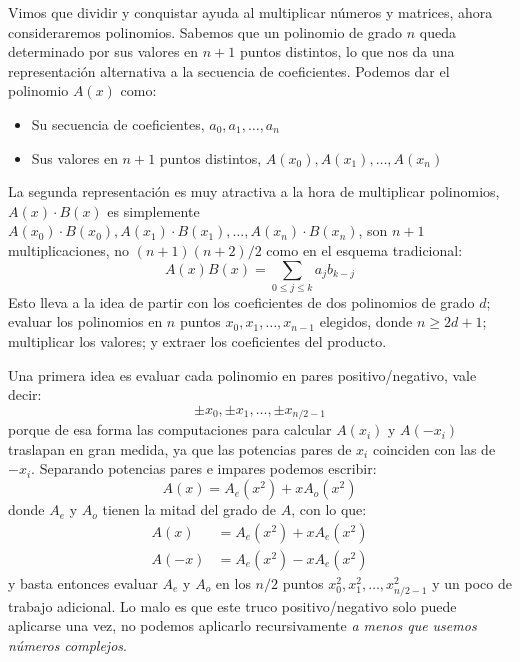   Vimos que dividir y conquistar ayuda al multiplicar números y matrices,
  ahora consideraremos polinomios.
  Sabemos que un polinomio de grado \(n\)
  queda determinado por sus valores en \(n + 1\) puntos distintos,
  lo que nos da una representación alternativa a la secuencia de coeficientes.
  Podemos dar el polinomio \(A(x)\) como:
  \begin{itemize}
  \item
    Su secuencia de coeficientes,
    \(a_0, a_1, \dotsc, a_n\)
  \item
    Sus valores en \(n + 1\) puntos distintos,
    \(A(x_0), A(x_1), \dotsc, A(x_n)\)
  \end{itemize}
  La segunda representación es muy atractiva
  a la hora de multiplicar polinomios,
  \(A(x) \cdot B(x)\) es simplemente
  \(A(x_0) \cdot B(x_0), A(x_1) \cdot B(x_1), \dotsc, A(x_n) \cdot B(x_n)\),
  son \(n + 1\) multiplicaciones,
  no \((n + 1) (n + 2) / 2\) como en el esquema tradicional:
  \begin{equation*}
    [x^k] A(x) B(x)
      = \sum_{0 \le j \le k} a_j b_{k - j}
  \end{equation*}
  Esto lleva a la idea de partir con los coeficientes
  de dos polinomios de grado \(d\);
  evaluar los polinomios en \(n\)
  puntos \(x_0, x_1, \dotsc, x_{n - 1}\) elegidos,
  donde \(n \ge 2 d + 1\);
  multiplicar los valores;
  y extraer los coeficientes del producto.

  Una primera idea es evaluar cada polinomio en pares positivo/negativo,
  vale decir:
  \begin{equation*}
    \pm x_0, \pm x_1, \dotsc, \pm x_{n / 2 - 1}
  \end{equation*}
  porque de esa forma
  las computaciones para calcular \(A(x_i)\) y \(A(-x_i)\)
  traslapan en gran medida,
  ya que las potencias pares de \(x_i\) coinciden con las de \(-x_i\).
  Separando potencias pares e impares podemos escribir:
  \begin{equation*}
    A(x)
      = A_e(x^2) + x A_o(x^2)
  \end{equation*}
  donde \(A_e\) y \(A_o\) tienen la mitad del grado de \(A\),
  con lo que:
  \begin{align*}
    A(x)
      &= A_e(x^2) + x A_e(x^2) \\
    A(-x)
      &= A_e(x^2) - x A_e(x^2)
  \end{align*}
  y basta entonces evaluar \(A_e\) y \(A_o\) en los \(n / 2\) puntos
  \(x_0^2, x_1^2, \dotsc, x_{n/2 - 1}^2\) y un poco de trabajo adicional.
  Lo malo es que este truco positivo/negativo
  solo puede aplicarse una vez,
  no podemos aplicarlo recursivamente
  \emph{a menos que usemos números complejos}.

